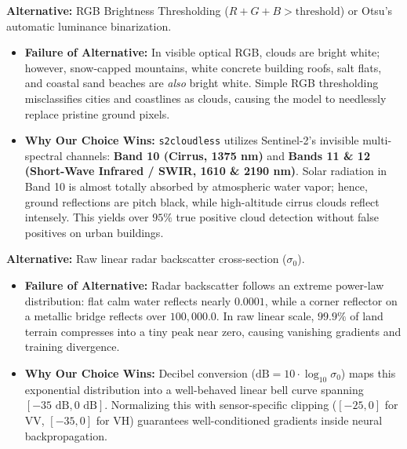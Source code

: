 \documentclass[11pt,a4paper]{article}
\begin{document}
\begin{tcolorbox}[colback=white,colframe=secondary,title=\textbf{2. Why ESA's \texttt{s2cloudless} instead of Simple RGB Color or Otsu Thresholding?}]
\textbf{Alternative:} RGB Brightness Thresholding ($R+G+B > \text{threshold}$) or Otsu's automatic luminance binarization.
\begin{itemize}[leftmargin=1.2em, itemsep=0.2em]
    \item \textbf{Failure of Alternative:} In visible optical RGB, clouds are bright white; however, snow-capped mountains, white concrete building roofs, salt flats, and coastal sand beaches are \textit{also} bright white. Simple RGB thresholding misclassifies cities and coastlines as clouds, causing the model to needlessly replace pristine ground pixels.
    \item \textbf{Why Our Choice Wins:} \texttt{s2cloudless} utilizes Sentinel-2's invisible multi-spectral channels: \textbf{Band 10 (Cirrus, 1375 nm)} and \textbf{Bands 11 \& 12 (Short-Wave Infrared / SWIR, 1610 \& 2190 nm)}. Solar radiation in Band 10 is almost totally absorbed by atmospheric water vapor; hence, ground reflections are pitch black, while high-altitude cirrus clouds reflect intensely. This yields over $95\%$ true positive cloud detection without false positives on urban buildings.
\end{itemize}
\end{tcolorbox}

\begin{tcolorbox}[colback=white,colframe=primary,title=\textbf{3. Why Logarithmic Decibel (dB) Scaling for SAR instead of Raw Linear Amplitude?}]
\textbf{Alternative:} Raw linear radar backscatter cross-section ($\sigma_0$).
\begin{itemize}[leftmargin=1.2em, itemsep=0.2em]
    \item \textbf{Failure of Alternative:} Radar backscatter follows an extreme power-law distribution: flat calm water reflects nearly $0.0001$, while a corner reflector on a metallic bridge reflects over $100{,}000.0$. In raw linear scale, $99.9\%$ of land terrain compresses into a tiny peak near zero, causing vanishing gradients and training divergence.
    \item \textbf{Why Our Choice Wins:} Decibel conversion ($\text{dB} = 10 \cdot \log_{10} \sigma_0$) maps this exponential distribution into a well-behaved linear bell curve spanning $[-35\text{ dB}, 0\text{ dB}]$. Normalizing this with sensor-specific clipping ($[-25, 0]$ for VV, $[-35, 0]$ for VH) guarantees well-conditioned gradients inside neural backpropagation.
\end{itemize}
\end{tcolorbox}
\end{document}
